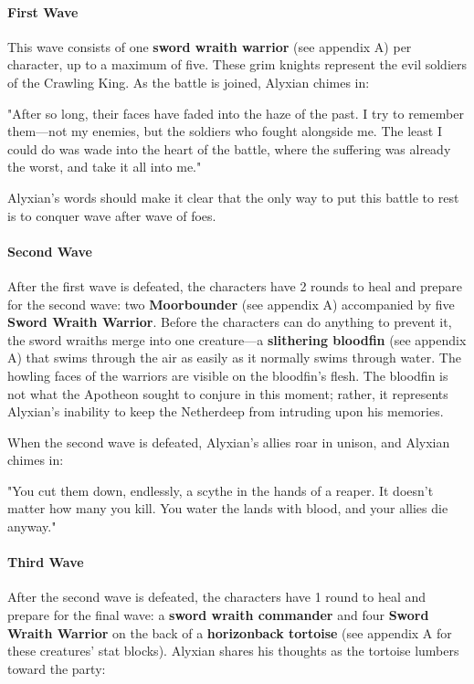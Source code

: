 \documentclass[10pt,a4paper,twoside,bg=print,twocolumn,openany,nodeprecatedcode]{dndbook}
\begin{document}
\paragraph{First Wave}
This wave consists of one \textbf{sword wraith warrior} (see appendix A) per character, up to a maximum of five. These grim knights represent the evil soldiers of the Crawling King. As the battle is joined, Alyxian chimes in:

\begin{DndReadAloud}{}
"After so long, their faces have faded into the haze of the past. I try to remember them—not my enemies, but the soldiers who fought alongside me. The least I could do was wade into the heart of the battle, where the suffering was already the worst, and take it all into me."

\end{DndReadAloud}

Alyxian's words should make it clear that the only way to put this battle to rest is to conquer wave after wave of foes.

\paragraph{Second Wave}
After the first wave is defeated, the characters have 2 rounds to heal and prepare for the second wave: two \textbf{Moorbounder} (see appendix A) accompanied by five \textbf{Sword Wraith Warrior}. Before the characters can do anything to prevent it, the sword wraiths merge into one creature—a \textbf{slithering bloodfin} (see appendix A) that swims through the air as easily as it normally swims through water. The howling faces of the warriors are visible on the bloodfin's flesh. The bloodfin is not what the Apotheon sought to conjure in this moment; rather, it represents Alyxian's inability to keep the Netherdeep from intruding upon his memories.

When the second wave is defeated, Alyxian's allies roar in unison, and Alyxian chimes in:

\begin{DndReadAloud}{}
"You cut them down, endlessly, a scythe in the hands of a reaper. It doesn't matter how many you kill. You water the lands with blood, and your allies die anyway."

\end{DndReadAloud}

\paragraph{Third Wave}
After the second wave is defeated, the characters have 1 round to heal and prepare for the final wave: a \textbf{sword wraith commander} and four \textbf{Sword Wraith Warrior} on the back of a \textbf{horizonback tortoise} (see appendix A for these creatures' stat blocks). Alyxian shares his thoughts as the tortoise lumbers toward the party:
\end{document}

